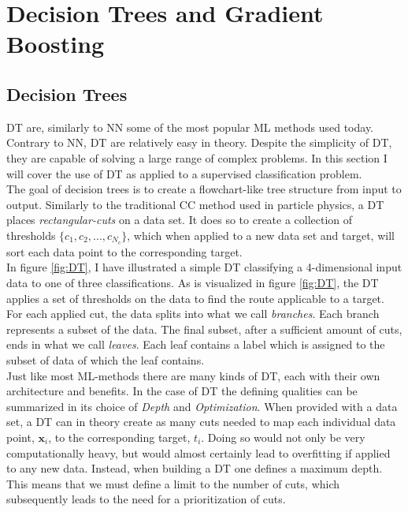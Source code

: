 \newpage
\section{Decision Trees and Gradient Boosting}
\subsection{Decision Trees}
\acf{DT} are, similarly to \ac{NN} some of the most popular \ac{ML} methods used today.
Contrary to \ac{NN}, \ac{DT} are relatively easy in theory. Despite the simplicity of \ac{DT}, 
they are capable of solving a large range of complex problems. In this section I will cover the use 
of \ac{DT} as applied to a supervised classification problem.
\\
The goal of decision trees is to create a flowchart-like tree structure from input to output. 
Similarly to the traditional \ac{CC} method used in particle physics, a \ac{DT} 
places \emph{rectangular-cuts} on a data set. It does so to create a collection of thresholds 
$\{c_1, c_2,...,c_{N_c}\}$, which when applied to a new data set and target, 
will sort each data point to the corresponding target. 
\\
In figure \ref{fig:DT}, I have illustrated a simple \ac{DT} classifying a 4-dimensional 
input data to one of three classifications. As is visualized in figure \ref{fig:DT}, the \ac{DT} 
applies a set of thresholds on the data to find the route applicable to a target. For each applied 
cut, the data splits into what we call \emph{branches}. Each branch represents a subset of the data.
The final subset, after a sufficient amount of cuts, ends in what we call \emph{leaves}. Each leaf contains
a label which is assigned to the subset of data of which the leaf contains.
\\  
Just like most \ac{ML}-methods there are many kinds of \ac{DT}, each with their own 
architecture and benefits. In the case of \ac{DT} the defining qualities can be summarized in
its choice of \emph{Depth} and \emph{Optimization}. When provided with a data set,
a \ac{DT} can in theory create as many cuts needed to map each individual data point, $\textbf{x}_i$, to the 
corresponding target, $t_i$. Doing so would not only be very computationally heavy, but would almost 
certainly lead to overfitting if applied to any new data. Instead, when building a \ac{DT} one defines 
a maximum depth. This means that we must define a limit to the number of cuts, which 
subsequently leads to the need for a prioritization of cuts. 
\\
